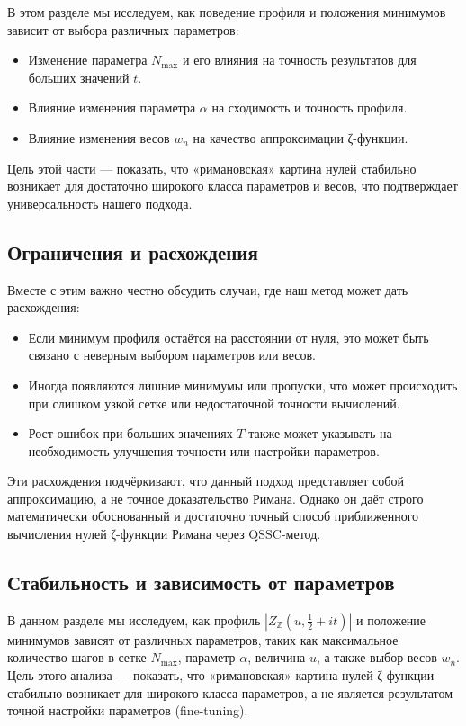 \documentclass{article}
\numberwithin{equation}{section}
\theoremstyle{plain}
\theoremstyle{definition}
\theoremstyle{remark}
\def\alpha{α}\def\beta{β}\def\gamma{γ}\def\Gamma{Γ}%
\begin{document}
\noindent
В этом разделе мы исследуем, как поведение профиля и положения минимумов зависит от выбора различных параметров:
\begin{itemize}
  \item Изменение параметра \( N_{\max} \) и его влияния на точность результатов для больших значений \( t \).
  \item Влияние изменения параметра \( \alpha \) на сходимость и точность профиля.
  \item Влияние изменения весов \( w_n \) на качество аппроксимации ζ-функции.
\end{itemize}

Цель этой части — показать, что «римановская» картина нулей стабильно возникает для достаточно широкого класса параметров и весов, что подтверждает универсальность нашего подхода.

\subsection{Ограничения и расхождения}
\label{subsec:limitations-and-discrepancies}

\noindent
Вместе с этим важно честно обсудить случаи, где наш метод может дать расхождения:
\begin{itemize}
  \item Если минимум профиля остаётся на расстоянии от нуля, это может быть связано с неверным выбором параметров или весов.
  \item Иногда появляются лишние минимумы или пропуски, что может происходить при слишком узкой сетке или недостаточной точности вычислений.
  \item Рост ошибок при больших значениях \( T \) также может указывать на необходимость улучшения точности или настройки параметров.
\end{itemize}

Эти расхождения подчёркивают, что данный подход представляет собой аппроксимацию, а не точное доказательство Римана. Однако он даёт строго математически обоснованный и достаточно точный способ приближенного вычисления нулей ζ-функции Римана через QSSC-метод.



\subsection{Стабильность и зависимость от параметров}
\label{subsec:stability-and-dependence}

\noindent
В данном разделе мы исследуем, как профиль \( |Z_{\mathbb{Z}}(u, \frac{1}{2} + it)| \) и положение минимумов зависят от различных параметров, таких как максимальное количество шагов в сетке \( N_{\max} \), параметр \( \alpha \), величина \( u \), а также выбор весов \( w_n \). Цель этого анализа — показать, что «римановская» картина нулей ζ-функции стабильно возникает для широкого класса параметров, а не является результатом точной настройки параметров (fine-tuning).
\end{document}
